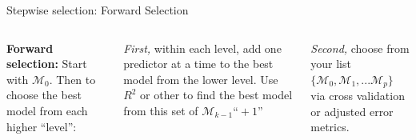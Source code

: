 \documentclass[mathserif, handout, aspectratio=169]{beamer}
\begin{document}
\begin{frame}{Stepwise selection: Forward Selection}

\begin{columns}

\textbf{Forward selection:} Start with $\mathcal{M}_0$.  Then to choose the best model from each higher ``level'':

\vspace{5mm}
\textit{First, }within each level, add one predictor at a time to the best model from the lower level.  Use $R^2$ or other to find the best model from this set of $\mathcal{M}_{k-1} \text{``}+ 1\text{''}$

\vspace{5mm}

\textit{Second,} choose from your list $\{\mathcal{M}_0, \mathcal{M}_1,...\mathcal{M}_{p}\}$ via cross validation or adjusted error metrics.\\~\\



\end{columns}
\end{frame}
\end{document}
